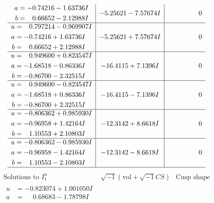 \documentclass[1p]{elsarticle_modified}
\theoremstyle{definition}
\newcommand{\I}{\sqrt{-1}}
\begin{document}
$$\begin{array}{c|c|c}
\begin{aligned}
a &= -0.74216 - 1.63736 I \\
b &= \phantom{-}0.66652 - 2.12988 I\end{aligned}
 & -5.25621 - 7.57674 I & \phantom{-0.000000 } 0 \\ \hline\begin{aligned}
u &= \phantom{-}0.797214 - 0.969907 I \\
a &= -0.74216 + 1.63736 I \\
b &= \phantom{-}0.66652 + 2.12988 I\end{aligned}
 & -5.25621 + 7.57674 I & \phantom{-0.000000 } 0 \\ \hline\begin{aligned}
u &= \phantom{-}0.949600 + 0.823547 I \\
a &= -1.68518 - 0.86336 I \\
b &= -0.86700 - 2.32515 I\end{aligned}
 & -16.4115 + 7.1396 I & \phantom{-0.000000 } 0 \\ \hline\begin{aligned}
u &= \phantom{-}0.949600 - 0.823547 I \\
a &= -1.68518 + 0.86336 I \\
b &= -0.86700 + 2.32515 I\end{aligned}
 & -16.4115 - 7.1396 I & \phantom{-0.000000 } 0 \\ \hline\begin{aligned}
u &= -0.806362 + 0.985930 I \\
a &= -0.96958 + 1.42164 I \\
b &= \phantom{-}1.10553 + 2.10803 I\end{aligned}
 & -12.3142 + 8.6618 I & \phantom{-0.000000 } 0 \\ \hline\begin{aligned}
u &= -0.806362 - 0.985930 I \\
a &= -0.96958 - 1.42164 I \\
b &= \phantom{-}1.10553 - 2.10803 I\end{aligned}
 & -12.3142 - 8.6618 I & \phantom{-0.000000 } 0\\
 \hline 
 \end{array}$$\newpage$$\begin{array}{c|c|c}  
\text{Solutions to }I^u_{1}& \I (\text{vol} + \sqrt{-1}CS) & \text{Cusp shape}\\
 \hline 
\begin{aligned}
u &= -0.823074 + 1.001050 I \\
a &= \phantom{-}0.68683 - 1.78798 I \\

\end{aligned}
\end{array}$$
\end{document}
